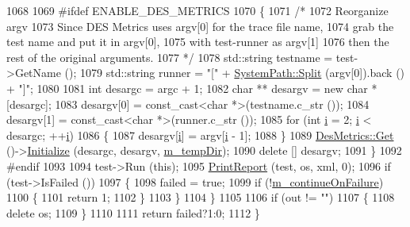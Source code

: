 \begin{DoxyCode}
1068 
1069 \textcolor{preprocessor}{#ifdef ENABLE\_DES\_METRICS}
1070       \{
1071         \textcolor{comment}{/*}
1072 \textcolor{comment}{          Reorganize argv}
1073 \textcolor{comment}{          Since DES Metrics uses argv[0] for the trace file name,}
1074 \textcolor{comment}{          grab the test name and put it in argv[0],}
1075 \textcolor{comment}{          with test-runner as argv[1]}
1076 \textcolor{comment}{          then the rest of the original arguments.}
1077 \textcolor{comment}{        */}
1078         std::string testname = test->GetName ();
1079         std::string runner = \textcolor{stringliteral}{"["} + \hyperlink{group__systempath_ga523072e05da63b63113d1bea840edf1a}{SystemPath::Split} (argv[0]).back () + \textcolor{stringliteral}{"]"};
1080 
1081         \textcolor{keywordtype}{int}  desargc = argc + 1;
1082         \textcolor{keywordtype}{char} ** desargv = \textcolor{keyword}{new} \textcolor{keywordtype}{char} * [desargc];
1083         desargv[0] = \textcolor{keyword}{const\_cast<}\textcolor{keywordtype}{char} *\textcolor{keyword}{>}(testname.c\_str ());
1084         desargv[1] = \textcolor{keyword}{const\_cast<}\textcolor{keywordtype}{char} *\textcolor{keyword}{>}(runner.c\_str ());
1085         \textcolor{keywordflow}{for} (\textcolor{keywordtype}{int} \hyperlink{bernuolliDistribution_8m_a6f6ccfcf58b31cb6412107d9d5281426}{i} = 2; \hyperlink{bernuolliDistribution_8m_a6f6ccfcf58b31cb6412107d9d5281426}{i} < desargc; ++\hyperlink{bernuolliDistribution_8m_a6f6ccfcf58b31cb6412107d9d5281426}{i})
1086           \{
1087             desargv[\hyperlink{bernuolliDistribution_8m_a6f6ccfcf58b31cb6412107d9d5281426}{i}] = argv[\hyperlink{bernuolliDistribution_8m_a6f6ccfcf58b31cb6412107d9d5281426}{i} - 1];
1088           \}
1089         \hyperlink{classns3_1_1Singleton_a80a2cd3c25a27ea72add7a9f7a141ffa}{DesMetrics::Get} ()->\hyperlink{classns3_1_1DesMetrics_a63bf3891d9fd2cf8c76b375b3db67756}{Initialize} (desargc, desargv, 
      \hyperlink{classns3_1_1TestRunnerImpl_a659f2ebce866a2fc11e8dfee14b8b802}{m\_tempDir});
1090         \textcolor{keyword}{delete} [] desargv;
1091       \}
1092 \textcolor{preprocessor}{#endif}
1093       
1094       test->Run (\textcolor{keyword}{this});
1095       \hyperlink{classns3_1_1TestRunnerImpl_a959b05cdd96f86f4be4490f16186f7c5}{PrintReport} (test, os, xml, 0);
1096       \textcolor{keywordflow}{if} (test->IsFailed ())
1097         \{
1098           failed = \textcolor{keyword}{true};
1099           \textcolor{keywordflow}{if} (!\hyperlink{classns3_1_1TestRunnerImpl_a4302ab85e8be3b0d88b240b556248daf}{m\_continueOnFailure})
1100             \{
1101               \textcolor{keywordflow}{return} 1;
1102             \}
1103         \}
1104     \}
1105 
1106   \textcolor{keywordflow}{if} (out != \textcolor{stringliteral}{""})
1107     \{
1108       \textcolor{keyword}{delete} os;
1109     \}
1110 
1111   \textcolor{keywordflow}{return} failed?1:0;
1112 \}
\end{DoxyCode}


